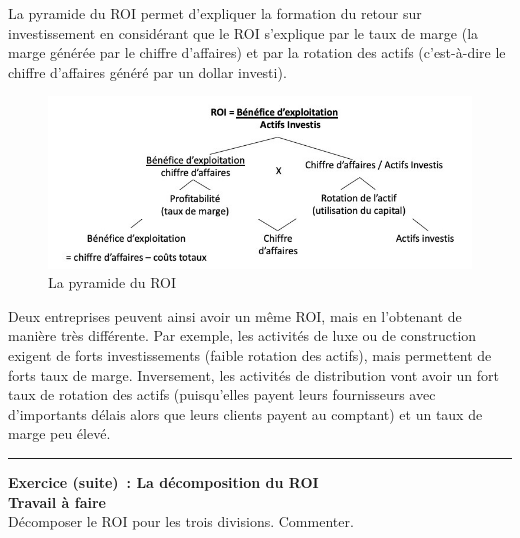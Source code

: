 \documentclass{kaobook}
\begin{document}
La pyramide du ROI permet d'expliquer la formation du retour sur investissement en considérant que le ROI s'explique par le taux de marge (la marge générée par le chiffre d'affaires) et par la rotation des actifs (c'est-à-dire le chiffre d'affaires généré par un dollar investi).\\
\begin{figure}[htbp]
\centering
\includegraphics[width=.9\linewidth]{./img/roi.jpeg}
\caption{La pyramide du ROI}
\end{figure}

Deux entreprises peuvent ainsi avoir un même ROI, mais en l'obtenant de manière très différente. Par exemple, les activités de luxe ou de construction exigent de forts investissements (faible rotation des actifs), mais permettent de forts taux de marge. Inversement, les activités de distribution vont avoir un fort taux de rotation des actifs (puisqu'elles payent leurs fournisseurs avec d'importants délais alors que leurs clients payent au comptant) et un taux de marge peu élevé.\\

\noindent\rule{\textwidth}{0.5pt}
\textbf{Exercice (suite) : La décomposition du ROI}\\

\textbf{Travail à faire}\\
Décomposer le ROI pour les trois divisions. Commenter.\\
\end{document}
